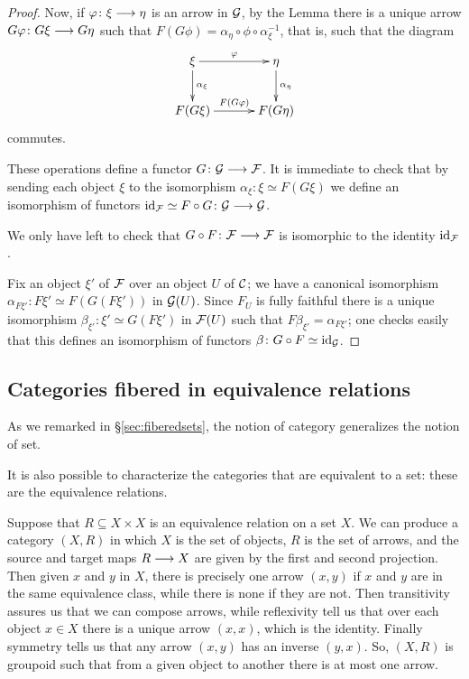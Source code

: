 \begin{3   FIBERED CATEGORIES}
\begin{3.5 Equivalences of fibered categories}
\begin{proof}
Now, if $\phi\colon \xi \arr \eta$ is an arrow in $\mathcal{G}$, by the Lemma there is a unique arrow $G \phi \colon G \xi \arr G \eta$ such that $F(G \phi) = \alpha_\eta\circ \phi \circ \alpha_\xi^{-1}$, that is, such that the diagram
   \[
   \xymatrix@C+8pt{{}\xi\ar[r]^{\phi}\ar[d]^{\alpha_\xi}& 
   {}\eta\ar[d]^{\alpha_\eta}\\
   F(G \xi)\ar[r]^{F(G \phi)}&F(G \eta)}
   \] commutes.

These operations define a functor $G \colon  \cG \arr \cF$. It is immediate to check that by sending each object $\xi$ to the isomorphism $\alpha_\xi \colon \xi \simeq F(G \xi)$ we define an isomorphism of functors $\id_{\mathcal F} \simeq F \circ G \colon \cG \arr \cG$. 

We only have left to check that $G \circ F \colon \cF \arr \cF$ is isomorphic to the identity $\mathrm{id}_{\mathcal F}$. 

Fix an object $\xi'$ of $\mathcal{F}$ over an object $U$ of $\mathcal{C}$; we have a canonical isomorphism $\alpha_{F \xi'} \colon F \xi' \simeq F(G(F \xi'))$ in $\mathcal{G}(U)$. Since $F_U$ is fully faithful there is a unique isomorphism $\beta_{\xi'} \colon \xi' \simeq G(F \xi')$ in $\mathcal{F}(U)$ such that $F \beta_{\xi'} = \alpha_{F \xi'}$; one checks easily that this defines an isomorphism of functors $\beta\colon G \circ F \simeq \mathrm{id}_{\mathcal G}$.
\end{proof}


\subsection{Categories fibered in equivalence relations}\label{subsec:fibered-eq-relations}

As we remarked in \S\ref{sec:fiberedsets}, the notion of category generalizes the notion of set.

It is also possible to characterize the categories that are equivalent to a set: these are the equivalence relations.

Suppose that $R \subseteq X \times X$ is an equivalence relation on a set $X$. We can produce a category $(X,R)$ in which $X$ is the set of objects, $R$ is the set of arrows, and the source and target maps $R \arr X$ are given by the first and second projection. Then given $x$ and $y$ in $X$, there is precisely one arrow $(x,y)$ if $x$ and $y$ are in the same equivalence class, while there is none if they are not. Then transitivity assures us that we can compose arrows, while reflexivity tell us that over each object $x \in X$ there is a unique arrow $(x,x)$, which is the identity. Finally symmetry tells us that any arrow $(x,y)$ has an inverse $(y,x)$. So, $(X, R)$ is groupoid such that from a given object to another there is at most one arrow.


\end{3.5 Equivalences of fibered categories}
\end{3   FIBERED CATEGORIES}
